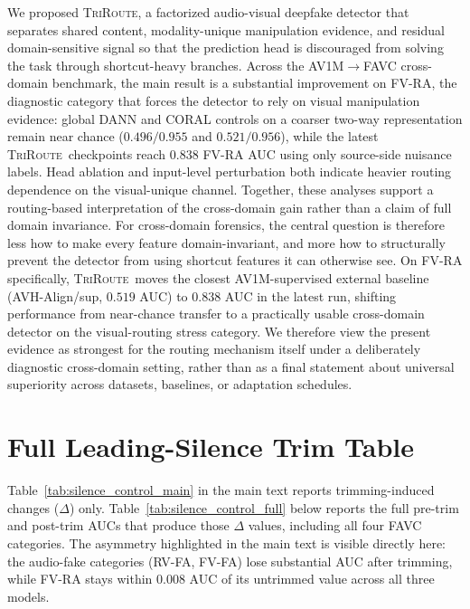 \documentclass{article}
\newcommand{\method}{\textsc{TriRoute}}
\begin{document}
We proposed \method, a factorized audio-visual deepfake detector that separates shared content, modality-unique manipulation evidence, and residual domain-sensitive signal so that the prediction head is discouraged from solving the task through shortcut-heavy branches. Across the AV1M$\rightarrow$FAVC cross-domain benchmark, the main result is a substantial improvement on FV-RA, the diagnostic category that forces the detector to rely on visual manipulation evidence: global DANN and CORAL controls on a coarser two-way representation remain near chance ($0.496/0.955$ and $0.521/0.956$), while the latest \method\ checkpoints reach $0.838$ FV-RA AUC using only source-side nuisance labels. Head ablation and input-level perturbation both indicate heavier routing dependence on the visual-unique channel. Together, these analyses support a routing-based interpretation of the cross-domain gain rather than a claim of full domain invariance. For cross-domain forensics, the central question is therefore less how to make every feature domain-invariant, and more how to structurally prevent the detector from using shortcut features it can otherwise see.
On FV-RA specifically, \method\ moves the closest AV1M-supervised external baseline (AVH-Align/sup, $0.519$ AUC) to $0.838$ AUC in the latest run, shifting performance from near-chance transfer to a practically usable cross-domain detector on the visual-routing stress category.
We therefore view the present evidence as strongest for the routing mechanism itself under a deliberately diagnostic cross-domain setting, rather than as a final statement about universal superiority across datasets, baselines, or adaptation schedules.




\newpage
\appendix
\section{Full Leading-Silence Trim Table}
\label{app:silence_full}

Table~\ref{tab:silence_control_main} in the main text reports trimming-induced changes ($\Delta$) only. Table~\ref{tab:silence_control_full} below reports the full pre-trim and post-trim AUCs that produce those $\Delta$ values, including all four FAVC categories. The asymmetry highlighted in the main text is visible directly here: the audio-fake categories (RV-FA, FV-FA) lose substantial AUC after trimming, while FV-RA stays within $0.008$ AUC of its untrimmed value across all three models.
\end{document}
